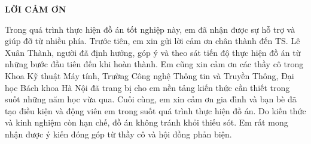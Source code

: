 \documentclass[../DoAn.tex]{subfiles}
\begin{document}
\begin{center}
    \Large{\textbf{LỜI CẢM ƠN}}\\
\end{center}
\vspace{1cm}

Trong quá trình thực hiện đồ án tốt nghiệp này, em đã nhận được sự hỗ trợ và giúp đỡ từ
nhiều phía.
Trước tiên, em xin gửi lời cảm ơn chân thành đến TS. Lê Xuân Thành, người đã định hướng, góp ý và theo sát tiến độ thực hiện đồ án từ những bước đầu tiên đến khi hoàn thành.
Em cũng xin cảm ơn các thầy cô trong Khoa Kỹ thuật Máy tính, Trường Công nghệ Thông tin và Truyền Thông, Đại học Bách khoa Hà Nội đã trang bị cho em nền tảng kiến thức cần thiết trong suốt những năm học vừa qua.
Cuối cùng, em xin cảm ơn gia đình và bạn bè đã tạo điều kiện và động viên em trong suốt quá trình thực hiện đồ án.
Do kiến thức và kinh nghiệm còn hạn chế, đồ án không tránh khỏi thiếu sót. Em rất mong nhận được ý kiến đóng góp từ thầy cô và hội đồng phản biện.
\end{document}
